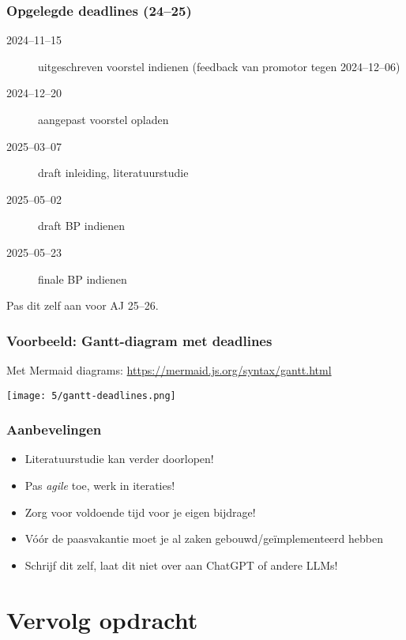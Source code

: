 \documentclass[aspectratio=169]{beamer}
\begin{document}
\begin{frame}
  \frametitle{Opgelegde deadlines (24--25)}

  \begin{description}
    \item[2024--11--15] uitgeschreven voorstel indienen (feedback van promotor tegen 2024--12--06)
    \item[2024--12--20] aangepast voorstel opladen
    \item[2025--03--07] draft inleiding, literatuurstudie
    \item[2025--05--02] draft BP indienen
    \item[2025--05--23] finale BP indienen
  \end{description}

  \medskip

  Pas dit zelf aan voor AJ 25--26.

\end{frame}

\begin{frame}[plain]
  \frametitle{Voorbeeld: Gantt-diagram met deadlines}

  Met Mermaid diagrams: \url{https://mermaid.js.org/syntax/gantt.html}

  \centering
  \texttt{[image: 5/gantt-deadlines.png]}
\end{frame}

\begin{frame}
  \frametitle{Aanbevelingen}

  \begin{itemize}
    \item Literatuurstudie kan verder doorlopen!
    \item Pas \textit{agile} toe, werk in iteraties!
    \item Zorg voor voldoende tijd voor je eigen bijdrage!
    \item Vóór de paasvakantie moet je al zaken gebouwd/geïmplementeerd hebben
    \item Schrijf dit zelf, laat dit niet over aan ChatGPT of andere LLMs!
  \end{itemize}

\end{frame}

\section{Vervolg opdracht}
\end{document}
